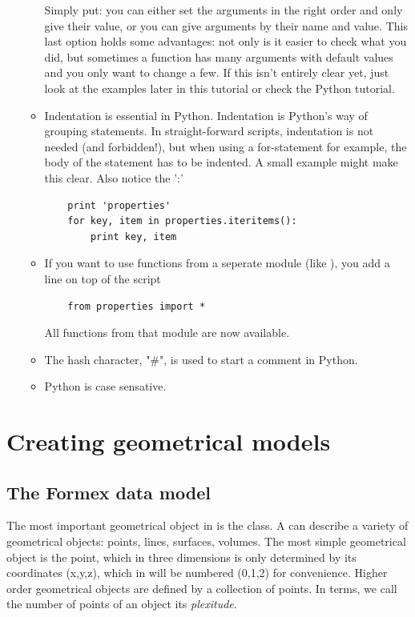 \begin{itemize}
\begin{itemize}
Simply put: you can either set the arguments in the right order and only give their value, or you can give arguments by their name and value. This last option holds some advantages: not only is it easier to check what you did, but sometimes a function has many arguments with default values and you only want to change a few.
If this isn't entirely clear yet, just look at the examples later in this tutorial or check the Python tutorial.
	\item Indentation is essential in Python. Indentation is Python's way of grouping statements. In straight-forward scripts, indentation is not needed (and forbidden!), but when using a for-statement for example, the body of the statement has to be indented. A small example might make this clear. Also notice the ':' 
\begin{verbatim}
	print 'properties'
	for key, item in properties.iteritems():
	    print key, item
\end{verbatim}
	\item If you want to use functions from a seperate module (like ), you add a line on top of the script
\begin{verbatim}
	from properties import *
\end{verbatim}
All functions from that module are now available.
	\item The hash character, "\#", is used to start a comment in Python.
	\item Python is case sensative.
	\end{itemize}
\end{itemize}


\section{Creating geometrical models}
\label{sec:geom}

\subsection{The Formex data model}

The most important geometrical object in \pyf is the  class. A  can describe a variety of geometrical objects: points, lines, surfaces, volumes. The most simple geometrical object is the point, which in three dimensions is only determined by its coordinates \code(x,y,z), which in \pyf will be numbered \code(0,1,2) for convenience. Higher order geometrical objects are defined by a collection of points. In \pyf terms, we call the number of points of an object its \emph{plexitude}. 

